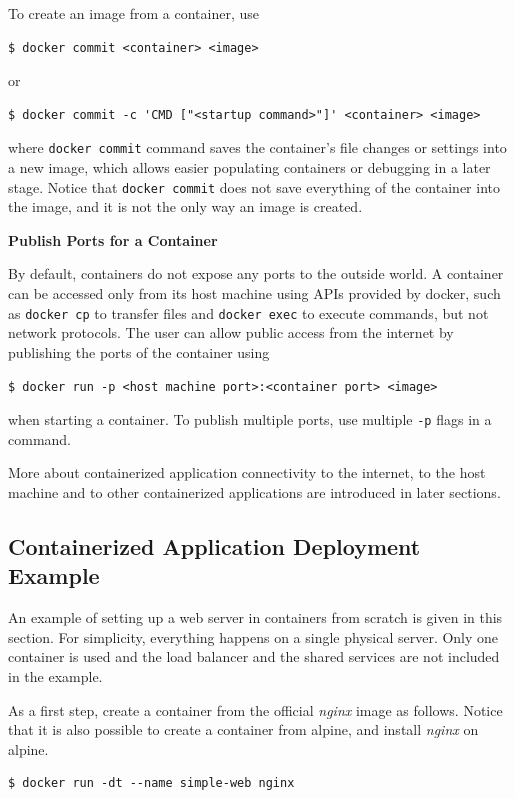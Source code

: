 To create an image from a container, use
\begin{lstlisting}
$ docker commit <container> <image>
\end{lstlisting}
or
\begin{lstlisting}
$ docker commit -c 'CMD ["<startup command>"]' <container> <image>
\end{lstlisting}
where \verb|docker commit| command saves the container's file changes or settings into a new image, which allows easier populating containers or debugging in a later stage. Notice that \verb|docker commit| does not save everything of the container into the image, and it is not the only way an image is created.

\vspace{0.1in}
\noindent \textbf{Publish Ports for a Container}
\vspace{0.1in}

By default, containers do not expose any ports to the outside world. A container can be accessed only from its host machine using APIs provided by docker, such as \verb|docker cp| to transfer files and \verb|docker exec| to execute commands, but not network protocols. The user can allow public access from the internet by publishing the ports of the container using
\begin{lstlisting}
$ docker run -p <host machine port>:<container port> <image>
\end{lstlisting}
when starting a container. To publish multiple ports, use multiple \verb|-p| flags in a command.

More about containerized application connectivity to the internet, to the host machine and to other containerized applications are introduced in later sections.

\subsection{Containerized Application Deployment Example}

An example of setting up a web server in containers from scratch is given in this section. For simplicity, everything happens on a single physical server. Only one container is used and the load balancer and the shared services are not included in the example.

As a first step, create a container from the official \textit{nginx} image as follows. Notice that it is also possible to create a container from alpine, and install \textit{nginx} on alpine.
\begin{lstlisting}
$ docker run -dt --name simple-web nginx
\end{lstlisting}

